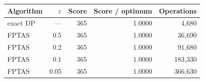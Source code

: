 \begin{tabular}{@{}l r r r r@{}}
\toprule
Algorithm & $\varepsilon$ & Score & Score / optimum & Operations\\
\midrule
exact DP & --- & 365 & 1.0000 & 4,680\\
FPTAS & 0.5 & 365 & 1.0000 & 36,690\\
FPTAS & 0.2 & 365 & 1.0000 & 91,680\\
FPTAS & 0.1 & 365 & 1.0000 & 183,330\\
FPTAS & 0.05 & 365 & 1.0000 & 366,630\\
\bottomrule
\end{tabular}
